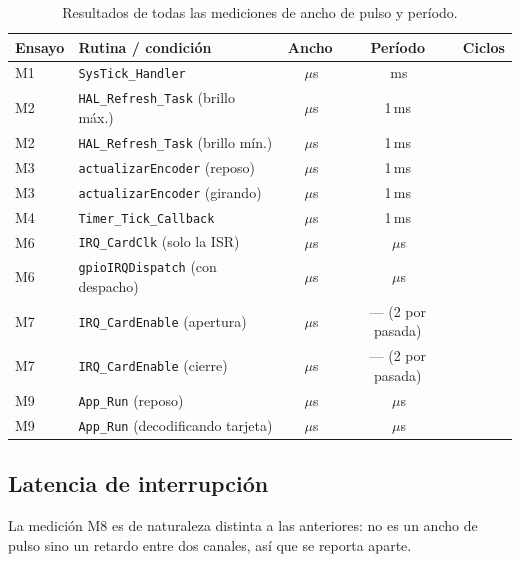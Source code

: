 \documentclass[11pt,a4paper]{article}
\newcommand{\dato}[1][2cm]{\underline{\hspace{#1}}}
\newcommand{\us}{\ensuremath{\mu}s}
\begin{document}
\begin{table}[H]
\centering
\begin{tabular}{@{}llccc@{}}
\toprule
\textbf{Ensayo} & \textbf{Rutina / condición} & \textbf{Ancho} & \textbf{Período} & \textbf{Ciclos} \\
\midrule
M1 & \texttt{SysTick\_Handler}                    & \dato[1.4cm]\,\us & \dato[1.3cm]\,ms  & \dato[1.3cm] \\
M2 & \texttt{HAL\_Refresh\_Task} (brillo máx.)     & \dato[1.4cm]\,\us & 1\,ms             & \dato[1.3cm] \\
M2 & \texttt{HAL\_Refresh\_Task} (brillo mín.)     & \dato[1.4cm]\,\us & 1\,ms             & \dato[1.3cm] \\
M3 & \texttt{actualizarEncoder} (reposo)           & \dato[1.4cm]\,\us & 1\,ms             & \dato[1.3cm] \\
M3 & \texttt{actualizarEncoder} (girando)          & \dato[1.4cm]\,\us & 1\,ms             & \dato[1.3cm] \\
M4 & \texttt{Timer\_Tick\_Callback}                & \dato[1.4cm]\,\us & 1\,ms             & \dato[1.3cm] \\
M6 & \texttt{IRQ\_CardClk} (solo la ISR)           & \dato[1.4cm]\,\us & \dato[1.3cm]\,\us & \dato[1.3cm] \\
M6 & \texttt{gpioIRQDispatch} (con despacho)       & \dato[1.4cm]\,\us & \dato[1.3cm]\,\us & \dato[1.3cm] \\
M7 & \texttt{IRQ\_CardEnable} (apertura)           & \dato[1.4cm]\,\us & --- (2 por pasada) & \dato[1.3cm] \\
M7 & \texttt{IRQ\_CardEnable} (cierre)             & \dato[1.4cm]\,\us & --- (2 por pasada) & \dato[1.3cm] \\
M9 & \texttt{App\_Run} (reposo)                    & \dato[1.4cm]\,\us & \dato[1.3cm]\,\us & \dato[1.3cm] \\
M9 & \texttt{App\_Run} (decodificando tarjeta)     & \dato[1.4cm]\,\us & \dato[1.3cm]\,\us & \dato[1.3cm] \\
\bottomrule
\end{tabular}
\caption{Resultados de todas las mediciones de ancho de pulso y período.}
\label{tab:resultados}
\end{table}

\subsection{Latencia de interrupción}

La medición M8 es de naturaleza distinta a las anteriores: no es un ancho de
pulso sino un retardo entre dos canales, así que se reporta aparte.
\end{document}
